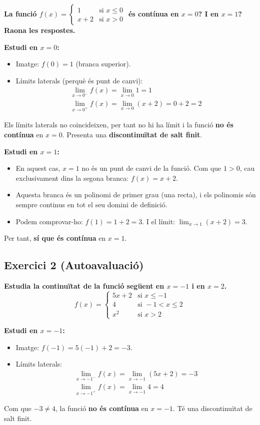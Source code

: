 \documentclass[12pt,a4paper]{article}
\begin{document}
\textbf{La funció $f(x) = \begin{cases} 1 & \text{si } x \le 0 \\ x+2 & \text{si } x > 0 \end{cases}$ és contínua en $x=0$? I en $x=1$? Raona les respostes.}

\textbf{Estudi en $x=0$:}
\begin{itemize}
    \item Imatge: $f(0) = 1$ (branca superior).
    \item Límits laterals (perquè és punt de canvi):
    \begin{align*}
        \lim_{x \to 0^-} f(x) = \lim_{x \to 0} 1 = 1 \\
        \lim_{x \to 0^+} f(x) = \lim_{x \to 0} (x+2) = 0+2 = 2
    \end{align*}
\end{itemize}
Els límits laterals no coincideixen, per tant no hi ha límit i la funció \textbf{no és contínua} en $x=0$. Presenta una \textbf{discontinuïtat de salt finit}.

\textbf{Estudi en $x=1$:}
\begin{itemize}
    \item En aquest cas, $x=1$ no és un punt de canvi de la funció. Com que $1 > 0$, cau exclusivament dins la segona branca: $f(x) = x+2$.
    \item Aquesta branca és un polinomi de primer grau (una recta), i els polinomis són sempre continus en tot el seu domini de definició.
    \item Podem comprovar-ho: $f(1) = 1+2 = 3$. I el límit: $\lim_{x \to 1} (x+2) = 3$. 
\end{itemize}
Per tant, \textbf{sí que és contínua} en $x=1$.

\vspace{0.5cm}

\subsection{Exercici 2 (Autoavaluació)}

\textbf{Estudia la continuïtat de la funció següent en $x=-1$ i en $x=2$.}
\[ f(x) = \begin{cases} 5x+2 & \text{si } x \le -1 \\ 4 & \text{si } -1 < x \le 2 \\ x^2 & \text{si } x > 2 \end{cases} \]

\textbf{Estudi en $x=-1$:}
\begin{itemize}
    \item Imatge: $f(-1) = 5(-1)+2 = -3$.
    \item Límits laterals:
    \begin{align*}
        \lim_{x \to -1^-} f(x) = \lim_{x \to -1} (5x+2) = -3 \\
        \lim_{x \to -1^+} f(x) = \lim_{x \to -1} 4 = 4
    \end{align*}
\end{itemize}
Com que $-3 \neq 4$, la funció \textbf{no és contínua} en $x=-1$. Té una discontinuïtat de salt finit.
\end{document}
